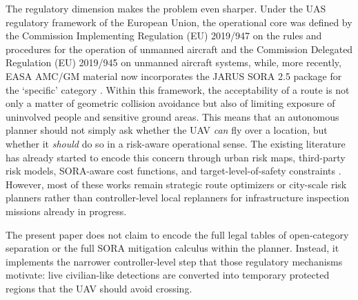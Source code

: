 \documentclass[electronics,article,submit,moreauthors]{Definitions/mdpi}
\begin{document}
The regulatory dimension makes the problem even sharper. Under the UAS regulatory framework of the European Union, the operational core was defined by the Commission Implementing Regulation (EU) 2019/947 on the rules and procedures for the operation of unmanned aircraft and the Commission Delegated Regulation (EU) 2019/945 on unmanned aircraft systems, while, more recently, EASA AMC/GM material now incorporates the JARUS SORA 2.5 package for the `specific' category \cite{EU2019_947,EU2019_945,JARUS_SORA_2_5_2024,EASA_AMC_GM_SORA25_2025}. Within this framework, the acceptability of a route is not only a matter of geometric collision avoidance but also of limiting exposure of uninvolved people and sensitive ground areas. This means that an autonomous planner should not simply ask whether the UAV \emph{can} fly over a location, but whether it \emph{should} do so in a risk-aware operational sense. The existing literature has already started to encode this concern through urban risk maps, third-party risk models, SORA-aware cost functions, and target-level-of-safety constraints \cite{primatesta2019riskaware,primatesta2020groundrisk,pang2022integrated,tang2023thirdparty,zhang2023groundrisk,heinze2023sora,brassel2025riskaware}. However, most of these works remain strategic route optimizers or city-scale risk planners rather than controller-level local replanners for infrastructure inspection missions already in progress.

The present paper does not claim to encode the full legal tables of open-category separation or the full SORA mitigation calculus within the planner. Instead, it implements the narrower controller-level step that those regulatory mechanisms motivate: live civilian-like detections are converted into temporary protected regions that the UAV should avoid crossing.
\end{document}
